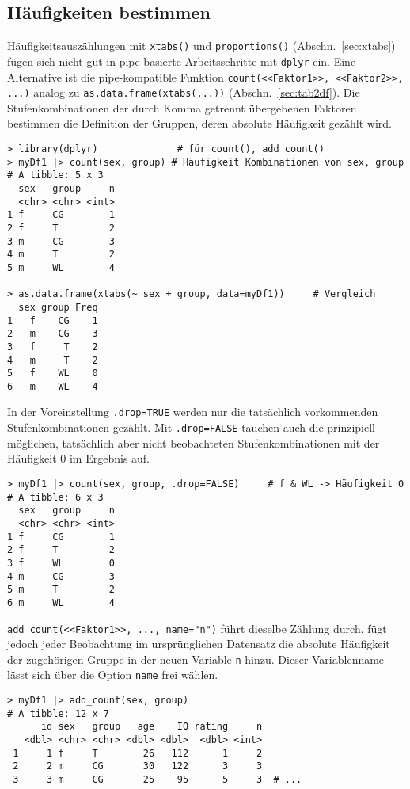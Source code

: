 \subsection{Häufigkeiten bestimmen}
\label{sec:dplyr_count}

Häufigkeitsauszählungen mit \lstinline!xtabs()! und \lstinline!proportions()! (Abschn.\ \ref{sec:xtabs}) fügen sich nicht gut in pipe-basierte Arbeitsschritte mit \lstinline!dplyr! ein. Eine Alternative ist die pipe-kompatible Funktion \lstinline!count(<<Faktor1>>, <<Faktor2>>, ...)! analog zu \lstinline!as.data.frame(xtabs(...))! (Abschn.\ \ref{sec:tab2df}). Die Stufenkombinationen der durch Komma getrennt übergebenen Faktoren bestimmen die Definition der Gruppen, deren absolute Häufigkeit gezählt wird.
\begin{lstlisting}
> library(dplyr)              # für count(), add_count()
> myDf1 |> count(sex, group) # Häufigkeit Kombinationen von sex, group
# A tibble: 5 x 3
  sex   group     n
  <chr> <chr> <int>
1 f     CG        1
2 f     T         2
3 m     CG        3
4 m     T         2
5 m     WL        4

> as.data.frame(xtabs(~ sex + group, data=myDf1))     # Vergleich
  sex group Freq
1   f    CG    1
2   m    CG    3
3   f     T    2
4   m     T    2
5   f    WL    0
6   m    WL    4
\end{lstlisting}

In der Voreinstellung \lstinline!.drop=TRUE! werden nur die tatsächlich vorkommenden Stufenkombinationen gezählt. Mit \lstinline!.drop=FALSE! tauchen auch die prinzipiell möglichen, tatsächlich aber nicht beobachteten Stufenkombinationen mit der Häufigkeit 0 im Ergebnis auf.
\begin{lstlisting}
> myDf1 |> count(sex, group, .drop=FALSE)     # f & WL -> Häufigkeit 0
# A tibble: 6 x 3
  sex   group     n
  <chr> <chr> <int>
1 f     CG        1
2 f     T         2
3 f     WL        0
4 m     CG        3
5 m     T         2
6 m     WL        4
\end{lstlisting}

\lstinline!add_count(<<Faktor1>>, ..., name="n")! führt dieselbe Zählung durch, fügt jedoch jeder Beobachtung im ursprünglichen Datensatz die absolute Häufigkeit der zugehörigen Gruppe in der neuen Variable \lstinline!n! hinzu. Dieser Variablenname lässt sich über die Option \lstinline!name! frei wählen.
\begin{lstlisting}
> myDf1 |> add_count(sex, group)
# A tibble: 12 x 7
      id sex   group   age    IQ rating     n
   <dbl> <chr> <chr> <dbl> <dbl>  <dbl> <int>
 1     1 f     T        26   112      1     2
 2     2 m     CG       30   122      3     3
 3     3 m     CG       25    95      5     3  # ...
\end{lstlisting}

